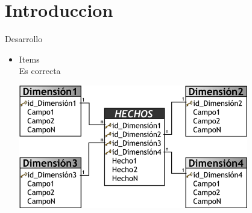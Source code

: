 \section{Introduccion} 
Desarrollo

\begin{itemize}
	\item Items
	\\Es correcta
	\begin{center}
	\includegraphics[width=10cm]{./Imagenes/1} 
	\end{center}



\end{itemize} 